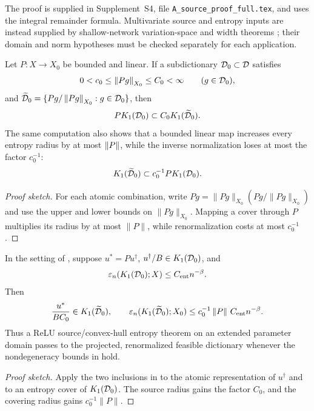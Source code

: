 The proof is supplied in Supplement~S4, file \texttt{A\_source\_proof\_full.tex}, and uses the integral remainder formula. Multivariate source and
entropy inputs are instead supplied by shallow-network variation-space and width theorems
\citep{SiegelXuVariation2023,SiegelXuSharp2024,MaoSiegelXu2026}; their domain and norm hypotheses
must be checked separately for each application.

\begin{lemma}
\label{lem:projection}
Let \(P:X\to X_0\) be bounded and linear. If a subdictionary \(\mathcal{D}_0\subset\mathcal{D}\) satisfies
\[
 0<c_0\leq\left\lVert Pg\right\rVert_{X_0}\leq C_0<\infty\qquad(g\in\mathcal{D}_0),
\]
and \(\widetilde{\mathcal{D}}_0=\{Pg/\left\lVert Pg\right\rVert_{X_0}:g\in\mathcal{D}_0\}\), then
\[
 P K_1(\mathcal{D}_0)\subset C_0K_1(\widetilde{\mathcal{D}}_0).
\]
The same computation also shows that a bounded linear map increases every entropy radius by at most
\(\left\lVert P\right\rVert\), while the inverse normalization loses at most the factor \(c_0^{-1}\):
\[
 K_1(\widetilde{\mathcal{D}}_0)\subset c_0^{-1}P K_1(\mathcal{D}_0).
\]
\end{lemma}

\begin{proof}[Proof sketch]
For each atomic combination, write $Pg=\|Pg\|_{X_0}(Pg/\|Pg\|_{X_0})$ and use the upper and lower bounds on $\|Pg\|_{X_0}$.  Mapping a cover through $P$ multiplies its radius by at most $\|P\|$, while renormalization costs at most $c_0^{-1}$.
\end{proof}

\begin{corollary}
\label{cor:projected-source-entropy}
In the setting of , suppose \(u^*=Pu^\dagger\),
\(u^\dagger/B\in K_1(\mathcal{D}_0)\), and
\[
 \varepsilon_n(K_1(\mathcal{D}_0);X)\leq C_{\rm ent}n^{-\beta}.
\]
Then
\[
 \frac{u^*}{BC_0}\in K_1(\widetilde{\mathcal{D}}_0),
 \qquad
 \varepsilon_n(K_1(\widetilde{\mathcal{D}}_0);X_0)
 \leq c_0^{-1}\left\lVert P\right\rVert\,C_{\rm ent}n^{-\beta}.
\]
Thus a ReLU source/convex-hull entropy theorem on an extended parameter domain passes to the projected,
renormalized feasible dictionary whenever the nondegeneracy bounds in  hold.
\end{corollary}

\begin{proof}[Proof sketch]
Apply the two inclusions in  to the atomic representation of $u^\dagger$ and to an entropy cover of $K_1(\mathcal{D}_0)$.  The source radius gains the factor $C_0$, and the covering radius gains $c_0^{-1}\|P\|$.
\end{proof}

